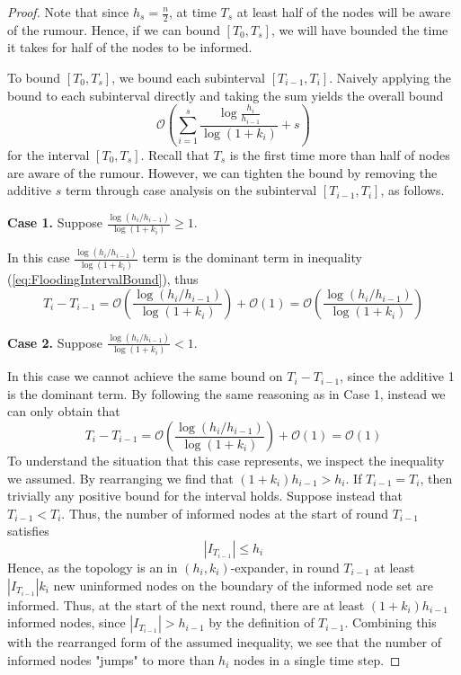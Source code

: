 \begin{proof}
	Note that since $h_s = \frac{n}{2}$, at time $T_s$ at least half of the nodes will be aware of the rumour. Hence, if we can bound $[T_0, T_s]$, we will have bounded the time it takes for half of the nodes to be informed. 

	To bound $[T_0, T_s]$, we bound each subinterval $[T_{i-1}, T_i]$. Naively applying the bound to each subinterval directly and taking the sum yields the overall bound 
	$$
		\mathcal{O}\left(\sum_{i=1}^s \frac{\log \frac{h_i}{h_{i-1}}}{\log(1+k_i)} + s\right)
	$$ 
	for the interval $[T_0,T_s]$. Recall that $T_s$ is the first time more than half of nodes are aware of the rumour. However, we can tighten the bound by removing the additive $s$ term through case analysis on the subinterval $[T_{i-1}, T_i]$, as follows.

	\textbf{Case 1.} Suppose $\frac{\log (h_i/h_{i-1})}{\log(1+k_i)} \geq 1$.

	In this case $\frac{\log (h_i/h_{i-1})}{\log(1+k_i)}$ term is the dominant term in inequality (\ref{eq:FloodingIntervalBound}), thus
	$$
		T_i - T_{i-1} = \mathcal{O}\left( \frac{\log (h_i/h_{i-1})}{\log(1+k_i) }\right) + \mathcal{O}(1) = \mathcal{O}\left( \frac{\log (h_i/h_{i-1})}{\log(1+k_i) }\right)
	$$

	\textbf{Case 2.} Suppose $\frac{\log (h_i/h_{i-1})}{\log(1+k_i)} < 1$.

	In this case we cannot achieve the same bound on $T_i - T_{i-1}$, since the additive 1 is the dominant term. By following the same reasoning as in Case 1, instead we can only obtain that
	\begin{equation}\label{eq:Weak1StepBound}
		T_i - T_{i-1} = \mathcal{O}\left( \frac{\log (h_i/h_{i-1})}{\log(1+k_i) }\right) + \mathcal{O}(1) = \mathcal{O}(1)
	\end{equation}
	To understand the situation that this case represents, we inspect the inequality we assumed.
	By rearranging we find that $(1+k_i)h_{i-1} > h_i$. If $T_{i-1} = T_i$, then trivially any positive bound for the interval holds. Suppose instead that  $T_{i-1} < T_i$. Thus,
	the number of informed nodes at the start of round $T_{i-1}$ satisfies
	$$
		|I_{T_{i-1}}| \leq h_i
	$$
	Hence, as the topology is an in $(h_i, k_i)$-expander, in round $T_{i-1}$ at least $|I_{T_{i-1}}|k_i$ new uninformed nodes on the boundary of the informed node set are informed. Thus, at the start of the next round, there are at least $(1+k_i)h_{i-1}$ informed nodes, since $|I_{T_{i-1}}| > h_{i-1}$ by the definition of $T_{i-1}$. Combining this with the rearranged form of the assumed inequality, we see that the number of informed nodes "jumps" to more than $h_i$ nodes in a single time step.


\end{proof}
